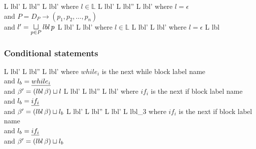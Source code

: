 \begin{trules}
        { {L} {lbl'} }
        { {L} {lbl''} \;\;  {L} {lbl'} }
        {where $l \in \mathbb{L}$}
        { {L} {lbl'} }
        { {L} {lbl''} \;  {L} {lbl'} }
        {where $l = \epsilon$\\
        and $P = D_P \rightarrow (p_1, p_2, \dots, p_n)$\\
        and $l' = \sqcupl\limits_{p \in P} lbl \, p$}
        { {L} {lbl'} }
        { {L} {lbl'} }
        {where $l \in \mathbb{L}$}
        { {L} {lbl'} }
        { {L} {lbl'} }
        {where $l = \epsilon$}
        { {L} {lbl} }
        {}
        {}
\end{trules}

\subsubsection{Conditional statements}

\begin{trules}
        { {L} {lbl'} }
        { {L} {lbl''} \;  {L} {lbl'} }
        {where $while_i$ is the next while block label name\\
          and $l_b = \underline{while_i}$\\
          and $\beta' = (lbl \, \beta) \sqcup l$}
        { {L} {lbl'} }
        { {L} {lbl''} \;  {L} {lbl'} }
        {where $if_i$ is the next if block label name\\
          and $l_b = \underline{if_i}$\\
          and $\beta' = (lbl \, \beta) \sqcup l_b$}
        { {L} {lbl'} }
        { {L} {lbl''} \;
           {L} {lbl'} \;
           {L} {lbl_3} }
        {where $if_i$ is the next if block label name\\
          and $l_b = \underline{if_i}$\\
          and $\beta' = (lbl \, \beta) \sqcup l_b$\\}
\end{trules}

